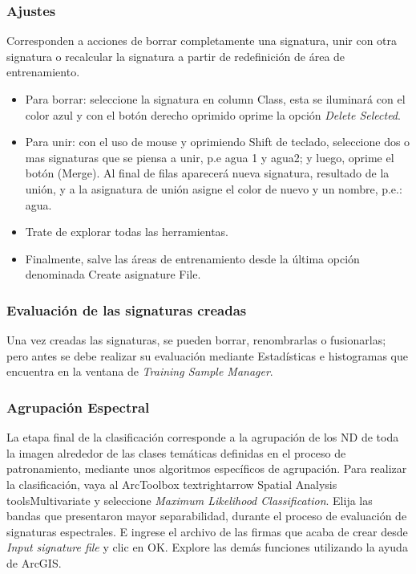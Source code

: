 \documentclass[a4paper,oneside,11pt,]{article}
\begin{document}
\subsubsection{Ajustes} 
Corresponden a acciones de borrar completamente una signatura, unir con otra signatura o recalcular la signatura a partir de redefinición de área de entrenamiento.
\begin{itemize}
\item Para borrar: seleccione la signatura en column Class, esta se iluminará con el color azul y con el botón derecho oprimido oprime la opción \emph{Delete Selected}.
\item Para unir: con el uso de mouse y oprimiendo Shift de teclado, seleccione dos o mas signaturas que se piensa a unir, p.e agua 1 y agua2; y luego, oprime el botón (Merge). Al final de filas aparecerá nueva signatura, resultado de la unión, y a la asignatura de unión asigne el color de nuevo y un nombre, p.e.: agua.
\item Trate de explorar todas las herramientas.
\item Finalmente, salve las áreas de entrenamiento desde la última opción denominada Create asignature File. 
\end{itemize}

\subsubsection{Evaluación de las signaturas creadas}
Una vez creadas las signaturas, se pueden borrar, renombrarlas o fusionarlas; pero antes se debe realizar su evaluación mediante Estadísticas e histogramas que encuentra en la ventana de \emph{Training Sample Manager}.

\subsubsection{Agrupación Espectral} 
La etapa final de la clasificación corresponde a la agrupación de los ND de toda la imagen alrededor de las clases temáticas definidas en el proceso de patronamiento, mediante unos algoritmos específicos de agrupación.
Para realizar la clasificación, vaya al ArcToolbox textrightarrow Spatial Analysis tools\textrightarrow Multivariate y seleccione \emph{Maximum Likelihood Classification}. Elija las bandas que presentaron mayor separabilidad, durante el proceso de evaluación de signaturas espectrales. E ingrese el archivo de las firmas que acaba de crear desde \emph{Input signature file} y clic en OK. Explore las demás funciones utilizando la ayuda de ArcGIS.
\end{document}
